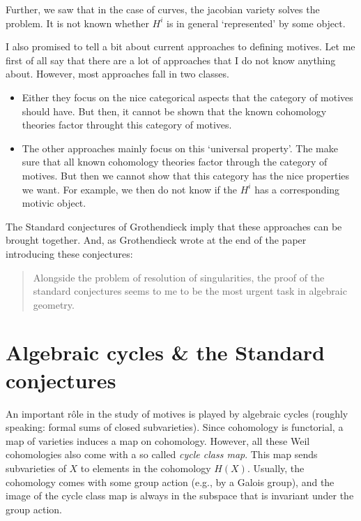 \documentclass[a4paper,10pt]{article}
\begin{document}
Further, we saw that in the case of curves, the jacobian variety solves the
problem. It is not known whether $H^{i}$ is in general `represented' by some
object.

I also promised to tell a bit about current approaches to defining motives. Let
me first of all say that there are a lot of approaches that I do not know
anything about. However, most approaches fall in two classes.
\begin{itemize} %
	\item Either they focus on the nice categorical aspects that the
		category of motives should have. But then, it cannot be shown
		that the known cohomology theories factor throught this
		category of motives.
	\item The other approaches mainly focus on this `universal property'.
		The make sure that all known cohomology theories factor through
		the category of motives. But then we cannot show that this
		category has the nice properties we want. For example, we then
		do not know if the $H^{i}$ has a corresponding motivic object.
\end{itemize} %
The Standard conjectures of Grothendieck imply that these approaches can be
brought together. And, as Grothendieck wrote at the end of the paper \cite{sc}
introducing these conjectures:
\begin{quote} %
	Alongside the problem of resolution of singularities, the proof of the
	standard conjectures seems to me to be the most urgent task in
	algebraic geometry. 
\end{quote} %

\appendix

\section{Algebraic cycles \& the Standard conjectures}

An important r\^{o}le in the study of motives is played by algebraic cycles
(roughly speaking: formal sums of closed subvarieties). Since cohomology is
functorial, a map of varieties induces a map on cohomology. However, all these
Weil cohomologies also come with a so called \emph{cycle class map}. This map
sends subvarieties of $X$ to elements in the cohomology $H(X)$. Usually, the
cohomology comes with some group action (e.g., by a Galois group), and the
image of the cycle class map is always in the subspace that is invariant under
the group action.
\end{document}
